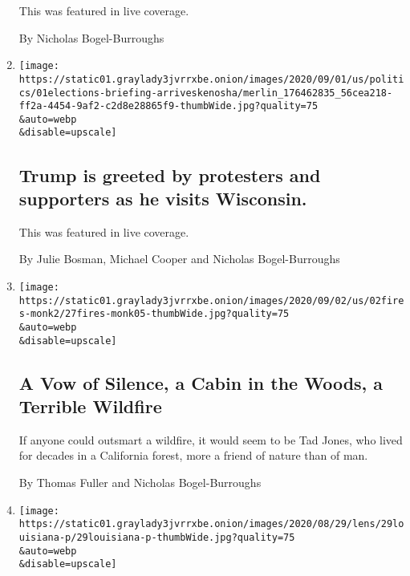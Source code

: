 \begin{enumerate}
  This was featured in live coverage.

  By Nicholas Bogel-Burroughs
\item
  \href{/live/2020/09/01/us/trump-vs-biden/trump-is-greeted-by-protesters-and-supporters-as-he-visits-wisconsin}{}

  \texttt{[image: https://static01.graylady3jvrrxbe.onion/images/2020/09/01/us/politics/01elections-briefing-arriveskenosha/merlin\_176462835\_56cea218-ff2a-4454-9af2-c2d8e28865f9-thumbWide.jpg?quality=75\\\&auto=webp\\\&disable=upscale]}

  \hypertarget{trump-is-greeted-by-protesters-and-supporters-as-he-visits-wisconsin}{%
  \subsection{Trump is greeted by protesters and supporters as he visits
  Wisconsin.}\label{trump-is-greeted-by-protesters-and-supporters-as-he-visits-wisconsin}}

  This was featured in live coverage.

  By Julie Bosman, Michael Cooper and Nicholas Bogel-Burroughs
\item
  \href{/2020/08/31/us/fires-california-monk-tad-jones-last-chance-santa-cruz.html}{}

  \texttt{[image: https://static01.graylady3jvrrxbe.onion/images/2020/09/02/us/02fires-monk2/27fires-monk05-thumbWide.jpg?quality=75\\\&auto=webp\\\&disable=upscale]}

  \hypertarget{a-vow-of-silence-a-cabin-in-the-woods-a-terrible-wildfire}{%
  \subsection{A Vow of Silence, a Cabin in the Woods, a Terrible
  Wildfire}\label{a-vow-of-silence-a-cabin-in-the-woods-a-terrible-wildfire}}

  If anyone could outsmart a wildfire, it would seem to be Tad Jones,
  who lived for decades in a California forest, more a friend of nature
  than of man.

  By Thomas Fuller and Nicholas Bogel-Burroughs
\item
  \href{/2020/08/29/us/louisiana-lake-charles-trump-power-generators.html}{}

  \texttt{[image: https://static01.graylady3jvrrxbe.onion/images/2020/08/29/lens/29louisiana-p/29louisiana-p-thumbWide.jpg?quality=75\\\&auto=webp\\\&disable=upscale]}

  \hypertarget{trump-visits-storm-ravaged-lake-charles-a-louisiana-city-still-without-power}{%
}
\end{enumerate}
